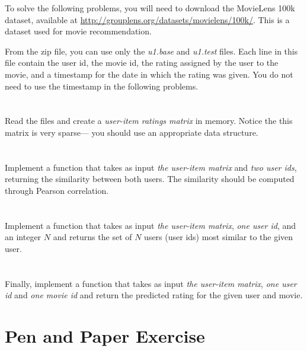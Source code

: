 \documentclass[12pt]{article}
\begin{document}

To solve the following problems, you will need to download the MovieLens 100k
dataset, available at \url{http://grouplens.org/datasets/movielens/100k/}. This
is a dataset used for movie recommendation.

From the zip file, you can use only the \emph{u1.base} and \emph{u1.test}
files. Each line in this file contain the user id, the movie id, the rating
assigned by the user to the movie, and a timestamp for the date in which the
rating was given. You do not need to use the timestamp in the following
problems.

\section{}

Read the files and create a \emph{user-item ratings matrix} in memory. Notice
the this matrix is very sparse--- you should use an appropriate data structure.

\section{}

Implement a function that takes as input \emph{the user-item matrix} and
\emph{two user ids}, returning the similarity between both users. The
similarity should be computed through Pearson correlation.

\section{}

Implement a function that takes as input \emph{the user-item matrix}, \emph{one
  user id}, and an integer $N$ and returns the set of $N$ users (user ids) most
similar to the given user.

\section{}

Finally, implement a function that takes as input \emph{the user-item matrix},
\emph{one user id} and \emph{one movie id} and return the predicted rating for
the given user and movie.

\section{Pen and Paper Exercise}
\end{document}

